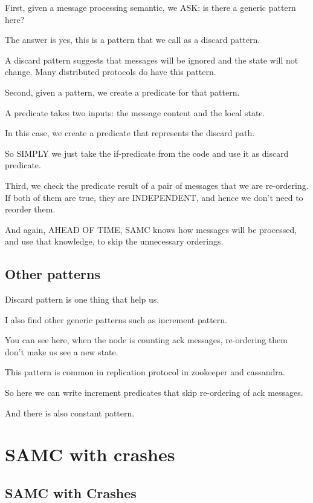 First, given a message processing semantic, we ASK: is there a generic pattern
here?

The answer is yes, this is a pattern that we call as a discard pattern.

A discard pattern suggests that messages will be ignored and the state will
not change. Many distributed protocols do have this pattern.

Second, given a pattern, we create a predicate for that pattern.

A predicate takes two inputs: the message content and the local state.

In this case, we create a predicate that represents the discard path.

So SIMPLY we just take the if-predicate from the code and use it as discard
predicate.

Third, we check the predicate result of a pair of messages that we are
re-ordering. If both of them are true, they are INDEPENDENT, and hence we don't
need to reorder them.

And again, AHEAD OF TIME, SAMC knows how messages will be processed, and use
that knowledge, to skip the unnecessary orderings.

\subsection{Other patterns}

Discard pattern is one thing that help us.

I also find other generic patterns such as increment pattern.

You can see here, when the node is counting ack messages, re-ordering them don't
make us see a new state.

This pattern is common in replication protocol in zookeeper and cassandra.

So here we can write increment predicates that skip re-ordering of ack messages.

And there is also constant pattern.

\section{SAMC with crashes}

\subsection{SAMC with Crashes}

